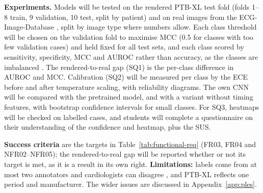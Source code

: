 \noindent\begin{minipage}{\linewidth}
\setlength{\parindent}{15pt}
\textbf{Experiments.} Models will be tested on the rendered PTB-XL test fold (folds 1--8 train, 9 validation, 10 test, split by patient) \cite{wagner_ptbxl_2020} and on real images from the ECG-Image-Database \cite{reyna_ecg-image-database_2024}, split by image type where numbers allow. Each class threshold will be chosen on the validation fold to maximise MCC (0.5 for classes with too few validation cases) and held fixed for all test sets, and each class scored by sensitivity, specificity, MCC and AUROC rather than accuracy, as the classes are imbalanced \cite{chicco_advantages_2020}. The rendered-to-real gap (SQ1) is the per-class difference in AUROC and MCC. Calibration (SQ2) will be measured per class by the ECE before and after temperature scaling, with reliability diagrams. The own CNN will be compared with the pretrained model, and with a variant without timing features, with bootstrap confidence intervals for small classes. For SQ3, heatmaps will be checked on labelled cases, and students will complete a questionnaire on their understanding of the confidence and heatmap, plus the SUS.
\end{minipage}

\textbf{Success criteria} are the targets in Table~\ref{tab:functional-req} (FR03, FR04 and NFR02--NFR05); the rendered-to-real gap will be reported whether or not its target is met, as it is a result in its own right. \textbf{Limitations:} labels come from at most two annotators and cardiologists can disagree \cite{wagner_ptbxl_2020,dhutia_interrater_2017}, and PTB-XL reflects one period and manufacturer. The wider issues are discussed in Appendix~\ref{app:ples}.